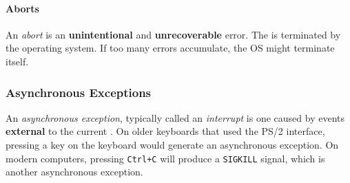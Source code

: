 \paragraph{Aborts}\label{par:Aborts}
\begin{definition}[Abort]\label{def:Abort}
  An \emph{abort} is an \textbf{unintentional} and \textbf{unrecoverable} error.
  The  is terminated by the operating system.
  If too many errors accumulate, the OS might terminate itself.
\end{definition}

\subsubsection{Asynchronous Exceptions}\label{subsubsec:Asynchronous_Exceptions}
\begin{definition}\label{def:Asynchronous_Exception}
  An \emph{asynchronous exception}, typically called an \emph{interrupt} is one caused by events \textbf{external} to the current .
  On older keyboards that used the PS/2 interface, pressing a key on the keyboard would generate an asynchronous exception.
  On modern computers, pressing \texttt{Ctrl+C} will produce a \texttt{SIGKILL} signal, which is another asynchronous exception.
\end{definition}


